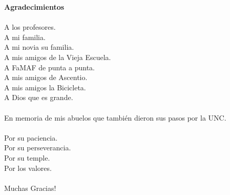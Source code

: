 {\huge \textbf{Agradecimientos}}\\
\\
A los profesores.\\
A mi familia.\\
A mi novia su familia.\\
A mis amigos de la Vieja Escuela.\\
A FaMAF de punta a punta.\\
A mis amigos de Ascentio.\\
A mis amigos la Bicicleta.\\ 
A Dios que es grande.\\
\\
En memoria de mis abuelos que tambi\'en dieron sus pasos por la UNC.\\\\
\noindent
Por su paciencia.\\
Por su perseverancia.\\
Por su temple.\\
Por los valores.\\
\\
Muchas Gracias!


\newpage